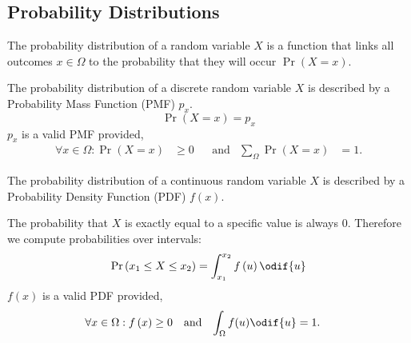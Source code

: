 \documentclass{article}
\begin{document}
\subsection{Probability Distributions}
\begin{definition}
    The probability distribution of a random variable \(X\) is a function that links all outcomes \(x \in \Omega\)
    to the probability that they will occur \(\Pr{\left( X = x \right)}\).
\end{definition}
\begin{definition}
    The probability distribution of a discrete random variable \(X\) is described by a Probability
    Mass Function (PMF) \(p_x\).
    \begin{equation*}
        \Pr{\left( X = x \right)} = p_x
    \end{equation*}
    \(p_x\) is a valid PMF provided,
    \begin{align*}
        \forall x \in \Omega : \Pr{\left( X = x \right)} & \geq 0 &  & \text{and} & \sum_\Omega \Pr{\left( X = x \right)} & = 1.
    \end{align*}
\end{definition}
\begin{definition}
    The probability distribution of a continuous random variable \(X\) is described by a Probability
    Density Function (PDF) \(f\left( x \right)\).

    The probability that \(X\) is exactly equal to a
    specific value is always 0. Therefore we compute probabilities over intervals:
    \begin{equation*}
        \Pr{\left( x_1 \leq X \leq x_2 \right)} = \int_{x_1}^{x_2} f\left( u \right) \odif{u}
    \end{equation*}
    \(f\left( x \right)\) is a valid PDF provided,
    \begin{align*}
        \forall x \in \Omega : f\left( x \right) & \geq 0 &  & \text{and} & \int_{\Omega} f(u) \odif{u} & = 1.
    \end{align*}
\end{definition}
\end{document}
